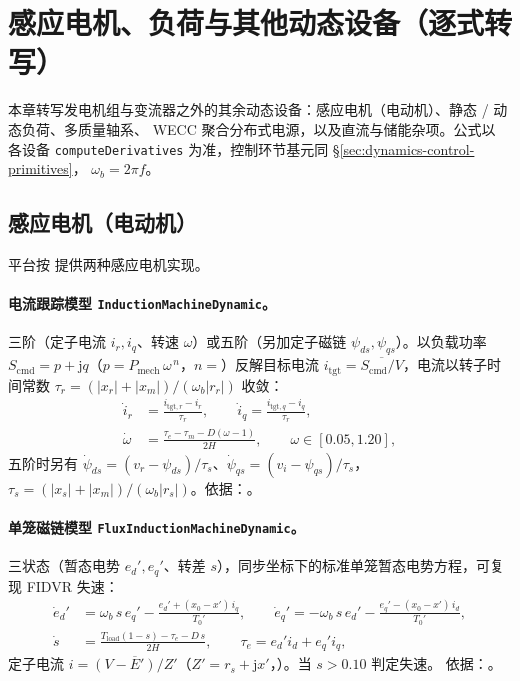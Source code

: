 \section{感应电机、负荷与其他动态设备（逐式转写）}
\label{sec:dynamics-device-motors-loads}

本章转写发电机组与变流器之外的其余动态设备：感应电机（电动机）、静态 / 动态负荷、多质量轴系、
WECC 聚合分布式电源，以及直流与储能杂项。公式以 
各设备 \texttt{computeDerivatives} 为准，控制环节基元同 \S\ref{sec:dynamics-control-primitives}，
$\omega_b=2\pi f$。

\subsection{感应电机（电动机）}
\label{sec:dynamics-induction}
平台按  提供两种感应电机实现。

\paragraph{电流跟踪模型 \texttt{InductionMachineDynamic}。}
三阶（定子电流 $i_r,i_q$、转速 $\omega$）或五阶（另加定子磁链 $\psi_{ds},\psi_{qs}$）。以负载功率
$S_{\mathrm{cmd}}=p+\mathrm jq$（$p=P_{\mathrm{mech}}\,\omega^{\,n}$，$n=$）反解目标电流
$i_{\mathrm{tgt}}=\overline{S_{\mathrm{cmd}}/V}$，电流以转子时间常数 $\tau_r=(|x_r|+|x_m|)/(\omega_b|r_r|)$ 收敛：
\begin{align}
 \dot i_r&=\frac{i_{\mathrm{tgt},r}-i_r}{\tau_r},\qquad \dot i_q=\frac{i_{\mathrm{tgt},q}-i_q}{\tau_r},\\
 \dot\omega&=\frac{\tau_e-\tau_m-D(\omega-1)}{2H},\qquad \omega\in[0.05,1.20],
\end{align}
五阶时另有 $\dot\psi_{ds}=(v_r-\psi_{ds})/\tau_s$、$\dot\psi_{qs}=(v_i-\psi_{qs})/\tau_s$，
$\tau_s=(|x_s|+|x_m|)/(\omega_b|r_s|)$。依据：。

\paragraph{单笼磁链模型 \texttt{FluxInductionMachineDynamic}。}
三状态（暂态电势 $e_d',e_q'$、转差 $s$），同步坐标下的标准单笼暂态电势方程，可复现 FIDVR 失速：
\begin{align}
 \dot e_d'&=\omega_b\,s\,e_q'-\frac{e_d'+(x_0-x')\,i_q}{T_0'},\qquad
 \dot e_q'=-\omega_b\,s\,e_d'-\frac{e_q'-(x_0-x')\,i_d}{T_0'},\\
 \dot s&=\frac{T_{\mathrm{load}}(1-s)-\tau_e-D\,s}{2H},\qquad \tau_e=e_d'i_d+e_q'i_q,
\end{align}
定子电流 $i=\overline{(V-E')/Z'}$（$Z'=r_s+\mathrm jx'$，）。当 $s>0.10$ 判定失速。
依据：。

